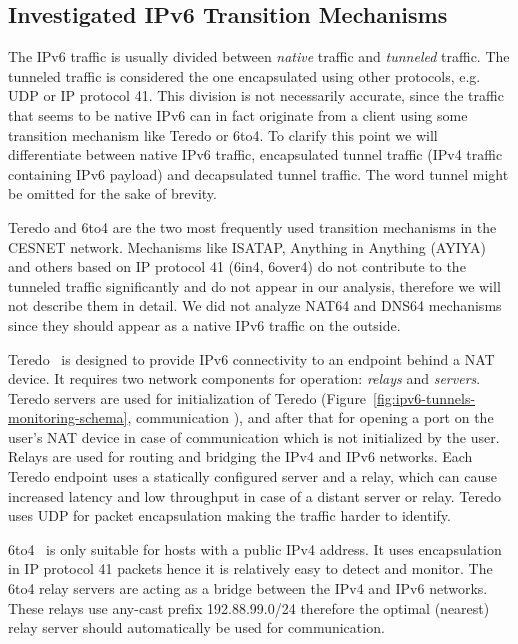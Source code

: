 \subsection{Investigated IPv6 Transition Mechanisms} \label{subsec:ipv6-tunnel-traffic}

The IPv6 traffic is usually divided between \emph{native} traffic and \emph{tunneled} traffic. The tunneled traffic is considered the one encapsulated using other protocols, e.g. UDP or IP protocol 41. This division is not necessarily accurate, since the traffic that seems to be native IPv6 can in fact originate from a client using some transition mechanism like Teredo or 6to4. To clarify this point we will differentiate between native IPv6 traffic, encapsulated tunnel traffic (IPv4 traffic containing IPv6 payload) and decapsulated tunnel traffic. The word tunnel might be omitted for the sake of brevity. 

Teredo and 6to4 are the two most frequently used transition mechanisms in the CESNET network. Mechanisms like ISATAP, Anything in Anything (AYIYA) and others based on IP protocol 41 (6in4, 6over4) do not contribute to the tunneled traffic significantly and do not appear in our analysis, therefore we will not describe them in detail. We did not analyze NAT64 and DNS64 mechanisms since they should appear as a native IPv6 traffic on the outside.

Teredo~\cite{rfc4380} is designed to provide IPv6 connectivity to an endpoint behind a NAT device. It requires two network components for operation: \emph{relays} and \emph{servers}. Teredo servers are used for initialization of Teredo (Figure~\ref{fig:ipv6-tunnels-monitoring-schema}, communication ), and after that for opening a port on the user's NAT device in case of communication which is not initialized by the user. Relays are used for routing and bridging the IPv4 and IPv6 networks. Each Teredo endpoint uses a statically configured server and a relay, which can cause increased latency and low throughput in case of a distant server or relay. Teredo uses UDP for packet encapsulation making the traffic harder to identify.

6to4~\cite{rfc3056} is only suitable for hosts with a public IPv4 address. It uses encapsulation in IP protocol 41 packets hence it is relatively easy to detect and monitor. The 6to4 relay servers are acting as a bridge between the IPv4 and IPv6 networks. These relays use any-cast prefix 192.88.99.0/24 therefore the optimal (nearest) relay server should automatically be used for communication.

